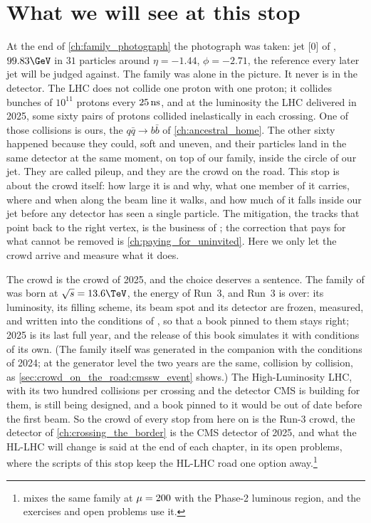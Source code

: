 \section{What we will see at this stop}
\label{sec:crowd_on_the_road:what_we_compute}

At the end of \cref{ch:family_photograph} the photograph was taken: jet [0]
of \akfour, $99.83\GeV$ in $31$ particles around $\eta=-1.44$, $\phi=-2.71$,
the reference every later jet will be judged against. The family was alone
in the picture. It never is in the detector. The LHC does not collide one
proton with one proton; it collides bunches of $10^{11}$ protons every
$25\,\mathrm{ns}$, and at the luminosity the LHC delivered in 2025, some sixty pairs
of protons collided inelastically in each crossing. One of those collisions
is ours, the $q\bar q\to b\bar b$ of \cref{ch:ancestral_home}. The other
sixty happened because they could, soft and uneven, and their particles
land in the same detector at the same moment, on top of our family, inside
the circle of our jet. They are called pileup, and they are the crowd on
the road. This stop is about the crowd itself: how large it is and why,
what one member of it carries, where and when along the beam line it
walks, and how much of it falls inside our jet before any detector has
seen a single particle. The mitigation, the tracks that point back to the
right vertex, is the business of
; the correction that
pays for what cannot be removed is \cref{ch:paying_for_uninvited}. Here we
only let the crowd arrive and measure what it does.

The crowd is the crowd of 2025, and the choice deserves a sentence. The
family of  was born at
$\sqrt{s}=13.6\TeV$, the energy of Run~3, and Run~3 is over: its
luminosity, its filling scheme, its beam spot and its detector are
frozen, measured, and written into the conditions of \CMSSW, so that a
book pinned to them stays right; 2025 is its last full year, and the
release of this book simulates it with conditions of its own. (The family
itself was generated in the companion with the conditions of 2024; at the
generator level the two years are the same, collision by collision, as
\cref{sec:crowd_on_the_road:cmssw_event} shows.) The High-Luminosity LHC, with its two
hundred collisions per crossing and the detector CMS is building for
them, is still being designed, and a book pinned to it would be out of
date before the first beam. So the crowd of every stop from here on is
the Run-3 crowd, the detector of \cref{ch:crossing_the_border} is the
CMS detector of 2025, and what the HL-LHC will change is said at the end of
each chapter, in its open problems, where the scripts of this stop keep
the HL-LHC road one option away.\footnote{ mixes the same family at $\mu=200$ with the Phase-2
luminous region, and the exercises and open problems use it.}

